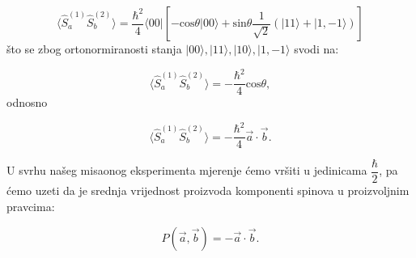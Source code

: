 \begin{equation}
    \langle  \hat{S}_a^{(1)}\hat{S}_b^{(2)} \rangle = \frac{\hbar^2}{4} \langle 00 | \left[ - \mathrm{cos}{\theta}|00\rangle + \mathrm{sin}{\theta} \frac{1}{\sqrt{2}} \left( | 11 \rangle + | 1, {-1} \rangle \right) \right]
\end{equation}
što se zbog ortonormiranosti stanja $| 00 \rangle,| 11 \rangle,| 10 \rangle,| 1,{-1}\rangle$ svodi na:

\begin{equation}
    \langle  \hat{S}_a^{(1)}\hat{S}_b^{(2)} \rangle = -\frac{\hbar^2}{4}\mathrm{cos}{\theta},
\end{equation}
odnosno

\begin{equation}
    \langle  \hat{S}_a^{(1)}\hat{S}_b^{(2)} \rangle = -\frac{\hbar^2}{4} \vec{a} \cdot \vec{b}.
\end{equation}

U svrhu našeg misaonog eksperimenta mjerenje ćemo vršiti u jedinicama $\dfrac{\hbar}{2}$, pa ćemo uzeti da je srednja vrijednost proizvoda komponenti spinova u proizvoljnim pravcima:

\begin{equation}
    P(\vec{a}, \vec{b}) = - \vec{a} \cdot \vec{b}.
\end{equation}